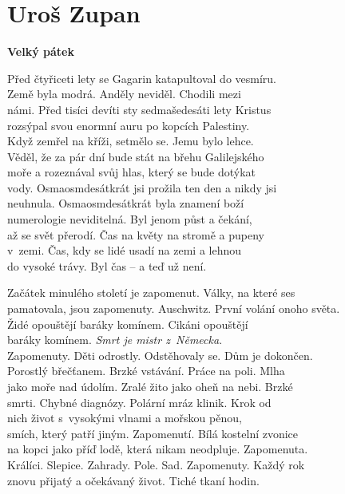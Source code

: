 \section{Uroš Zupan}

\noindent
\textbf{Velký pátek}

\medskip

\noindent
Před čtyřiceti lety se Gagarin  katapultoval do vesmíru. \\
\noindent
Země byla modrá. Anděly neviděl. Chodili mezi \\
\noindent
námi. Před tisíci devíti sty sedmašedesáti lety Kristus \\
\noindent
rozsýpal svou enormní auru po kopcích Palestiny. \\
\noindent
Když zemřel na kříži, setmělo se. Jemu bylo lehce. \\
\noindent
Věděl, že za pár dní bude stát na břehu Galilejského \\
\noindent
moře a rozeznával svůj hlas, který se bude dotýkat  \\
\noindent
vody. Osmaosmdesátkrát jsi prožila ten den a nikdy jsi  \\
\noindent
neuhnula. Osmaosmdesátkrát byla znamení boží \\
\noindent
numerologie neviditelná. Byl jenom půst a čekání, \\
\noindent
až se svět přerodí. Čas na květy na stromě a pupeny  \\
\noindent
v zemi. Čas, kdy se lidé usadí na zemi a lehnou \\
\noindent
do vysoké trávy. Byl čas -- a teď už není. \\

\medskip

\noindent
Začátek minulého století je zapomenut. Války, na které ses  \\
\noindent
pamatovala, jsou zapomenuty. Auschwitz. První volání onoho světa. \\
\noindent
Židé opouštějí baráky komínem. Cikáni opouštějí  \\
\noindent
baráky komínem. \textit{Smrt je mistr z Německa}. \\
\noindent
Zapomenuty. Děti odrostly. Odstěhovaly se. Dům je dokončen.  \\
\noindent
Porostlý  břečťanem. Brzké vstávání. Práce na poli. Mlha \\
\noindent
jako moře nad údolím. Zralé žito jako oheň na nebi. Brzké  \\
\noindent
smrti. Chybné diagnózy. Polární mráz klinik. Krok od \\
\noindent
nich život s vysokými vlnami a mořskou pěnou, \\
\noindent
smích, který patří jiným. Zapomenutí. Bílá kostelní zvonice \\
\noindent
na kopci jako příď lodě, která nikam neodpluje. Zapomenuta. \\
\noindent
Králíci. Slepice. Zahrady. Pole. Sad. Zapomenuty. Každý rok  \\
\noindent
znovu přijatý a očekávaný život. Tiché tkaní hodin. \\

